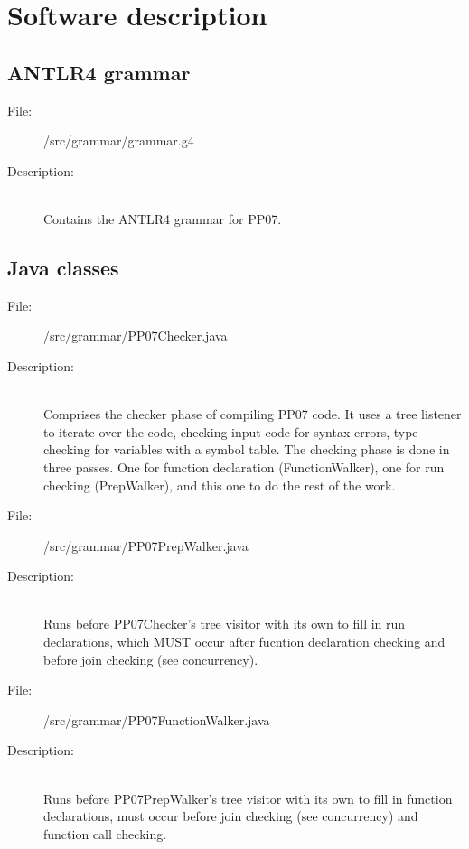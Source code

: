 \documentclass[10pt,a4paper]{report}
\begin{document}
\chapter{Software description}

\section{ANTLR4 grammar}

\begin{description}
	\item[File:] /src/grammar/grammar.g4
	\item[Description:] \hfill \\
		Contains the ANTLR4 grammar for PP07.
\end{description}


\section{Java classes}

\begin{description}
	\item[File:] /src/grammar/PP07Checker.java
	\item[Description:] \hfill \\
		Comprises the checker phase of compiling PP07 code. It uses a tree listener to iterate over the code, checking input code for syntax errors, type checking for variables with a symbol table. The checking phase is done in three passes. One for function declaration (FunctionWalker), one for run checking (PrepWalker), and this one to do the rest of the work.
\end{description}

\begin{description}
	\item[File:] /src/grammar/PP07PrepWalker.java
	\item[Description:] \hfill \\
		Runs before PP07Checker's tree visitor with its own to fill in run declarations, which MUST occur after fucntion declaration checking and before join checking (see concurrency). 
\end{description}

\begin{description}
	\item[File:] /src/grammar/PP07FunctionWalker.java
	\item[Description:] \hfill \\
		Runs before PP07PrepWalker's tree visitor with its own to fill in function declarations, must occur before join checking (see concurrency) and function call checking. 
\end{description}
\end{document}
